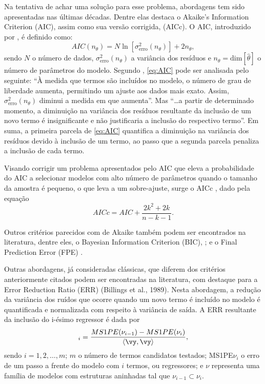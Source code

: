 Na tentativa de achar uma solução para esse problema, abordagens tem sido apresentadas nas últimas décadas.
Dentre elas destaca o Akaike’s Information Criterion (AIC), assim como sua versão corrigida, (AICc).
O AIC, introduzido por \cite{akaike1974}, é definido como:
\begin{equation}
    AIC(n_\theta) = N \ln[\sigma^2_{\text{erro}}(n_\theta)] + 2 n _\theta
\label{eq:AIC},
\end{equation}
sendo $N$ o número de dados, $\sigma^2_{\text{erro}}(n_\theta)$ a variância dos resíduos e $n_\theta = \text{dim}[\hat {\theta}]$ o número de parâmetros do modelo.
Segundo \cite{aguirre2015}, \eqref{eq:AIC} pode ser analisada pelo seguinte: ``À medida que termos são incluídos no modelo, o número de grau de liberdade aumenta, permitindo um ajuste aos dados mais exato. Assim, $\sigma^2_{\text{erro}}(n_\theta)$ diminui a medida em que  aumenta''.
Mas ``\dots a partir de determinado momento, a diminuição na variância dos resíduos resultante da inclusão de um novo termo é insignificante e não justificaria a inclusão do respectivo termo''.
Em suma, a primeira parcela de \eqref{eq:AIC} quantifica a diminuição na variância dos resíduos devido à inclusão de um termo, ao passo que a segunda parcela  penaliza a inclusão de cada termo. 

Visando corrigir um problema apresentados pelo AIC que eleva a probabilidade do AIC a selecionar modelos com alto número de parâmetros quando o tamanho da amostra é pequeno, o que leva a um sobre-ajuste, surge o AICc \citep{cavanaugh1997}, dado pela equação
\begin{equation}
    AICc = AIC + \frac{2k^2+2k}{n-k-1}
\label{eq:AICc}.
\end{equation}

Outros critérios parecidos com de Akaike também podem ser encontrados na literatura, dentre eles, o Bayesian Information Criterion (BIC), \citep{schwarz1978}; e o Final Prediction Error (FPE) \citep{kashyap1977}.

Outras abordagens, já consideradas clássicas, que diferem dos critérios anteriormente citados podem ser encontradas na literatura, com destaque para a Error Reduction Ratio (ERR) (Billings et al., 1989).
Nesta abordagem, a redução da variância  dos ruídos que ocorre quando um novo termo é incluído no modelo é quantificada e normalizada com respeito à variância de saída.
A ERR resultante da inclusão do i-ésimo regressor é dada por
\begin{equation}
    [\text{ERR}]_i  = \frac{MS1PE(\nu_{i-1})-MS1PE(\nu_i)}{\langle\vy,\vy\rangle}
\label{eq:ERR},
\end{equation}
sendo $i = 1, 2, \dots, m$; $m$ o número de termos candidatos testados;  MS1PE$\nu_i$ o erro de  um passo a frente do modelo com $i$ termos, ou regressores; e $\nu$ representa uma família de modelos com estruturas aninhadas tal que $\nu_{i-1} \subset \nu_i$.

